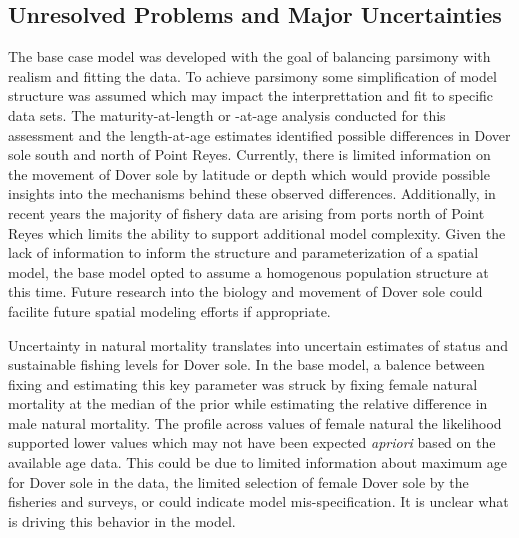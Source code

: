 \documentclass[11pt,
  english,
  a4paper,
]{article}
\begin{document}
\leavevmode\tagmcend\tagstructend\par


\hypertarget{unresolved-problems-and-major-uncertainties-1}{%
\subsection{Unresolved Problems and Major Uncertainties}\label{unresolved-problems-and-major-uncertainties-1}}

\leavevmode\tagmcend\tagstructend


The base case model was developed with the goal of balancing parsimony with realism and fitting the data. To achieve parsimony some simplification of model structure was assumed which may impact the interprettation and fit to specific data sets. The maturity-at-length or -at-age analysis conducted for this assessment and the length-at-age estimates identified possible differences in Dover sole south and north of Point Reyes. Currently, there is limited information on the movement of Dover sole by latitude or depth which would provide possible insights into the mechanisms behind these observed differences. Additionally, in recent years the majority of fishery data are arising from ports north of Point Reyes which limits the ability to support additional model complexity. Given the lack of information to inform the structure and parameterization of a spatial model, the base model opted to assume a homogenous population structure at this time. Future research into the biology and movement of Dover sole could facilite future spatial modeling efforts if appropriate.

\leavevmode\tagmcend\tagstructend\par


Uncertainty in natural mortality translates into uncertain estimates of status and sustainable fishing levels for Dover sole. In the base model, a balence between fixing and estimating this key parameter was struck by fixing female natural mortality at the median of the prior while estimating the relative difference in male natural mortality. The profile across values of female natural the likelihood supported lower values which may not have been expected \emph{apriori} based on the available age data. This could be due to limited information about maximum age for Dover sole in the data, the limited selection of female Dover sole by the fisheries and surveys, or could indicate model mis-specification. It is unclear what is driving this behavior in the model.
\end{document}
